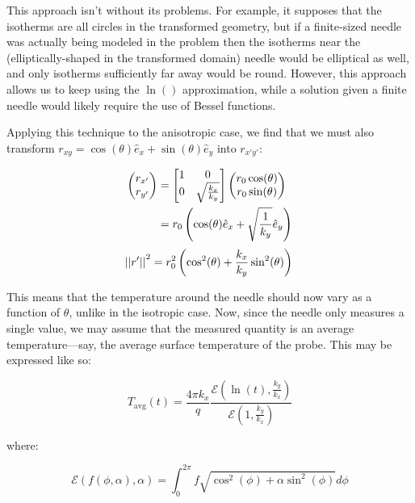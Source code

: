 This approach isn't without its problems. For example, it supposes that the
isotherms are all circles in the transformed geometry, but if a finite-sized
needle was actually being modeled in the problem then the isotherms near the
(elliptically-shaped in the transformed domain) needle would be elliptical as
well, and only isotherms sufficiently far away would be round. However, this
approach allows us to keep using the \(\ln()\) approximation, while a solution
given a finite needle would likely require the use of Bessel functions.

Applying this technique to the anisotropic case, we find that we must also
transform \(r_{xy} = \cos(\theta) \hat{e}_x + \sin(\theta) \hat{e}_y \)
into \(r_{x'y'}\):

\begin{align*}
    \begin{pmatrix}r_{x'} \\ r_{y'}\end{pmatrix} &=
    \begin{bmatrix}1 & 0\\ 0 & \sqrt{\frac{k_x}{k_y}} \end{bmatrix}\begin{pmatrix}r_0\cos(\theta) \\ r_0\sin(\theta)\end{pmatrix}\\
    &= r_0\left(\cos(\theta) \hat{e}_x + \sqrt{\frac1{k_y}} \hat{e}_y \right)\\
\end{align*}
\begin{equation}
    \left|\left|{r'}\right|\right|^2 = r_0^2 \left(\cos^2(\theta) + \frac{k_x}{k_y}\sin^2(\theta) \right)\\
\end{equation}

This means that the temperature around the needle should now vary as a function
of \(\theta\), unlike in the isotropic case. Now, since the needle only measures
a single value, we may assume that the measured quantity is an
average temperature---say, the average surface temperature of the probe.  This
may be expressed like so:

\begin{equation}
\label{eq:tavg}
T_{\textrm{avg}}(t) = \frac{4\pi k_x}{q} \frac{\mathcal{E}(\ln(t), \frac{k_y}{k_x})}{\mathcal{E}(1, \frac{k_y}{k_x})}
\end{equation}

where:

\begin{equation}
\mathcal{E}(f(\phi, \alpha), \alpha) = \int_0^{2\pi} f\sqrt{\cos^2(\phi) + \alpha\sin^2(\phi)} d\phi
\end{equation}

